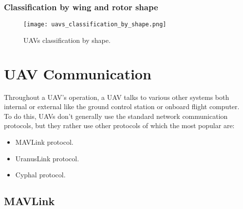 


\subsubsection*{Classification by wing and rotor shape}

\begin{figure}[H]
    \centering \texttt{[image: uavs\_classification\_by\_shape.png]}
    \caption{UAVs classification by shape. \cite{cfdflowengineeringclassificationofdrones}}
    \label{fig:uavs-classification-by-shape}
\end{figure}





\section{UAV Communication}
\label{sec:uav-communication}

Throughout a UAV's operation, a UAV talks to various other systems both internal or external like the ground control station or onboard flight computer. To do this, UAVs don't generally use the standard network communication protocols, but they rather use other protocols of which the most popular are:

\begin{itemize}
    \item MAVLink protocol.
    \item UranusLink protocol.
    \item Cyphal protocol.
\end{itemize}

\subsection{MAVLink}
\label{subsec:mavlink}

